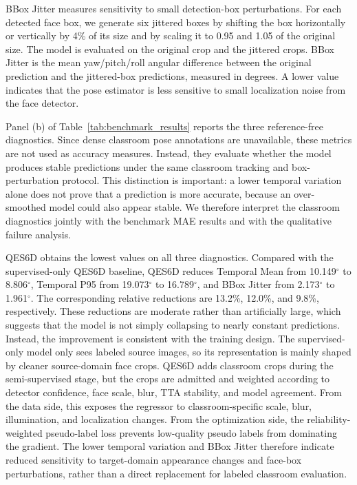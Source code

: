 \documentclass[preprint,12pt]{elsarticle}
\begin{document}
BBox Jitter measures sensitivity to small detection-box perturbations. For each detected face box, we generate six jittered boxes by shifting the box horizontally or vertically by 4\% of its size and by scaling it to 0.95 and 1.05 of the original size. The model is evaluated on the original crop and the jittered crops. BBox Jitter is the mean yaw/pitch/roll angular difference between the original prediction and the jittered-box predictions, measured in degrees. A lower value indicates that the pose estimator is less sensitive to small localization noise from the face detector.

Panel (b) of Table~\ref{tab:benchmark_results} reports the three reference-free diagnostics. Since dense classroom pose annotations are unavailable, these metrics are not used as accuracy measures. Instead, they evaluate whether the model produces stable predictions under the same classroom tracking and box-perturbation protocol. This distinction is important: a lower temporal variation alone does not prove that a prediction is more accurate, because an over-smoothed model could also appear stable. We therefore interpret the classroom diagnostics jointly with the benchmark MAE results and with the qualitative failure analysis.

QES6D obtains the lowest values on all three diagnostics. Compared with the supervised-only QES6D baseline, QES6D reduces Temporal Mean from 10.149$^\circ$ to 8.806$^\circ$, Temporal P95 from 19.073$^\circ$ to 16.789$^\circ$, and BBox Jitter from 2.173$^\circ$ to 1.961$^\circ$. The corresponding relative reductions are 13.2\%, 12.0\%, and 9.8\%, respectively. These reductions are moderate rather than artificially large, which suggests that the model is not simply collapsing to nearly constant predictions. Instead, the improvement is consistent with the training design. The supervised-only model only sees labeled source images, so its representation is mainly shaped by cleaner source-domain face crops. QES6D adds classroom crops during the semi-supervised stage, but the crops are admitted and weighted according to detector confidence, face scale, blur, TTA stability, and model agreement. From the data side, this exposes the regressor to classroom-specific scale, blur, illumination, and localization changes. From the optimization side, the reliability-weighted pseudo-label loss prevents low-quality pseudo labels from dominating the gradient. The lower temporal variation and BBox Jitter therefore indicate reduced sensitivity to target-domain appearance changes and face-box perturbations, rather than a direct replacement for labeled classroom evaluation.
\end{document}
